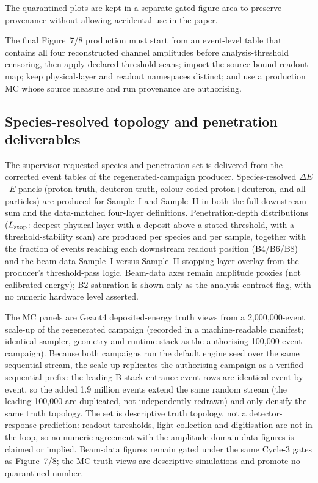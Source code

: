 The quarantined plots are kept in a separate gated figure area to preserve provenance without allowing accidental use in the paper.


The final Figure~7/8 production must start from an event-level table that contains all four reconstructed channel amplitudes before analysis-threshold censoring, then apply declared threshold scans; import the source-bound readout map; keep physical-layer and readout namespaces distinct; and use a production MC whose source measure and run provenance are authorising.

\subsection{Species-resolved topology and penetration deliverables}

The supervisor-requested species and penetration set is delivered from the
corrected event tables of the regenerated-campaign producer. Species-resolved
\(\Delta E\)--\(E\) panels (proton truth, deuteron truth, colour-coded
proton+deuteron, and all particles) are produced for Sample~I and Sample~II in
both the full downstream-sum and the data-matched four-layer definitions.
Penetration-depth distributions (\(L_{\rm stop}\): deepest physical layer with
a deposit above a stated threshold, with a threshold-stability scan) are
produced per species and per sample, together with the fraction of events
reaching each downstream readout position (B4/B6/B8) and the beam-data
Sample~I versus Sample~II stopping-layer overlay from the producer's
threshold-pass logic. Beam-data axes remain amplitude proxies (not calibrated
energy); B2 saturation is shown only as the analysis-contract flag, with no
numeric hardware level asserted.

The MC panels are Geant4 deposited-energy truth views from a 2{,}000{,}000-event
scale-up of the regenerated campaign
(recorded in a machine-readable manifest; identical
sampler, geometry and runtime stack as the authorising 100{,}000-event
campaign). Because both campaigns run the default engine seed over the same
sequential stream, the scale-up replicates the authorising campaign as a
verified sequential prefix: the leading B-stack-entrance event rows are
identical event-by-event, so the added 1.9 million events extend the same
random stream (the leading 100{,}000 are duplicated, not independently
redrawn) and only densify the same truth topology. The set is descriptive truth topology, not a detector-response
prediction: readout thresholds, light collection and digitisation are not in
the loop, so no numeric agreement with the amplitude-domain data figures is
claimed or implied. Beam-data figures remain gated under the same Cycle-3
gates as Figure~7/8; the MC truth views are descriptive simulations and promote no quarantined number.

